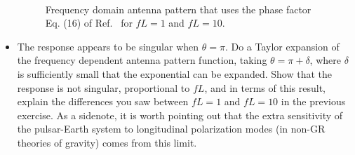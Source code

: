 \documentclass[prd,floatfix,preprintnumbers,amsmath,amssymb,nofootinbib,superscriptaddress]{revtex4}
\begin{document}
\begin{itemize}
\begin{figure}
\centering
\mbox{\quad
{}}
\caption{Frequency domain antenna pattern that uses the phase factor Eq. (16) of Ref.~\cite{Anholm} for $fL=1$ and $fL=10$.} 
\end{figure}

\item The response appears to be singular when $\theta=\pi$.  Do a Taylor expansion of the frequency dependent
antenna pattern function, taking $\theta=\pi+\delta$, where $\delta$ is sufficiently small that the exponential 
can be expanded. Show that the response is not singular, proportional to $fL$, and in terms of this result, 
explain the differences you saw between $fL=1$ and $fL=10$ 
in the previous exercise. As a sidenote, it is worth pointing out that the extra sensitivity of the pulsar-Earth system
to longitudinal polarization modes (in non-GR theories of gravity) comes from this limit. 



\end{itemize}
\end{document}
